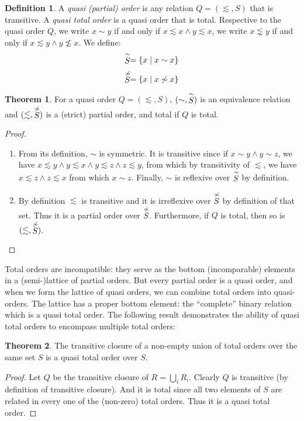 \documentclass[12pt]{article}
\theoremstyle{definition}
\newtheorem{definition}{Definition}[section]
\theoremstyle{theorem}
\newtheorem{theorem}{Theorem}[section]
\def\aset#1{\left\{{#1}\right\}}
\begin{document}
\begin{definition}
  A \emph{quasi (partial) order} is any relation $Q=(\lesssim,S)$ that is transitive.
  A \emph{quasi total order} is a quasi order that is total.
  Respective to the quasi order $Q$, we write \( x \sim y \) if and only if \( x \lesssim x \wedge y \lesssim x \), we write \( x \lnsim y \) if and only if \( x \lesssim y \wedge y \not\lesssim x \).  We define:
  \[ \SimHat{S} = \aset{x \mid x \sim x} \]
  \[ \NotSimHat{S} = \aset{x \mid x \not\sim x } \]
\end{definition}
\begin{theorem}
  For a quasi order $Q=(\lesssim,S)$, \((\sim,\stackrel{\sim}{S})\) is an equivalence relation and 
  \((\lesssim,\stackrel{\not\sim}{S})\) is a (strict) partial order, and total
  if $Q$ is total.
\end{theorem}
\begin{proof}
  
  \verb| |
  
  \begin{enumerate}
    \item
      From its definition, $\sim$ is symmetric.  It is transitive since if
      \( x \sim y \wedge y \sim z \), we have \( x \lesssim y \wedge y
      \lesssim x \wedge y \lesssim z \wedge z \lesssim y \), from which
      by transitivity of $\lesssim$, we have \( x \lesssim z \wedge z
      \lesssim x \) from which \( x \sim z \).  Finally, $\sim$ is
      reflexive over \(\stackrel{\sim}{S}\) by definition.
    \item
      By definition $\lesssim$ is transitive and it is irreflexive over
      $\stackrel{\not\sim}{S}$ by definition of that set.  Thus it is a partial
      order over $\stackrel{\not\sim}{S}$.  Furthermore, if $Q$ is total, then
      so is \((\lesssim,\stackrel{\not\sim}{S})\).
  \end{enumerate}
\end{proof}

Total orders are incompatible: they serve as the bottom (incomparable)
elements in a (semi-)lattice of partial orders.  But every partial order is a
quasi order, and when we form the lattice of quasi orders, we can
combine total orders into quasi-orders.  The lattice has a proper
bottom element: the ``complete'' binary relation which is a quasi
total order.  The following result demonstrates the ability of quasi
total orders to encompass multiple total orders:

\begin{theorem}
  The transitive closure of a non-empty union of total orders over the
  same set $S$ is a
  quasi total order over $S$.
\end{theorem}
\begin{proof}
  Let \( Q \) be the transitive closure of \(R = \bigcup_i R_i\).  Clearly
  $Q$ is transitive (by definition of transitive closure).  And it is
  total since all two elements of $S$ are related in every one of the
  (non-zero) total orders.  Thus it is a quasi total order.
\end{proof}
\end{document}
